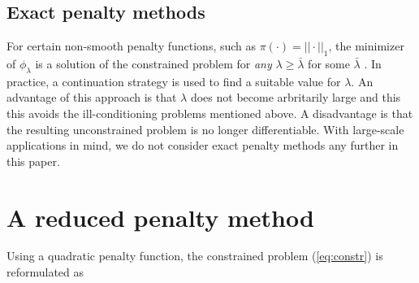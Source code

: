 \documentclass{iopart}
\begin{document}
\subsection{Exact penalty methods}
For certain non-smooth penalty functions, such as $\pi(\cdot) = ||\cdot||_1$, the minimizer of $\phi_{\lambda}$
is a solution of the constrained problem for \emph{any} $\lambda \geq \bar{\lambda}$ for some $\bar{\lambda}$
\cite[Thm. 17.3]{Nocedal}. In practice, a continuation
strategy is used to find a suitable value for $\lambda$. An advantage of this approach is that $\lambda$ does
not become arbritarily large and this this avoids the ill-conditioning problems mentioned above. A disadvantage
is that the resulting unconstrained problem is no longer differentiable. 
With large-scale applications in mind, we do not consider exact penalty methods any further in this paper.

\section{A reduced penalty method}
\label{varpro}
Using a quadratic penalty function, the constrained problem (\ref{eq:constr}) is reformulated as
\end{document}
